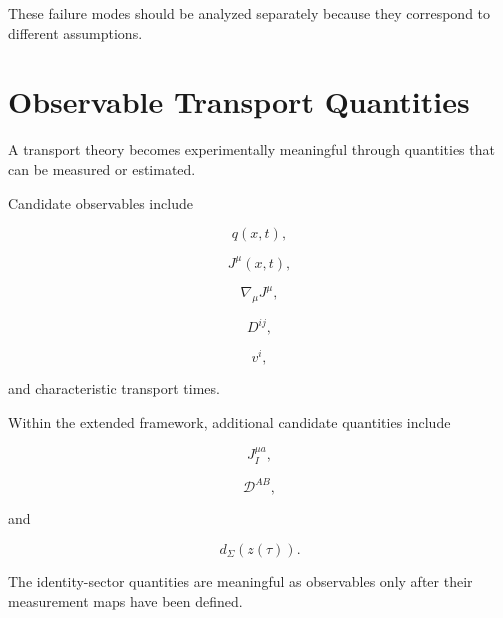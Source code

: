 \documentclass[12pt,oneside]{book}
\begin{document}
These failure modes should be analyzed separately because they
correspond to different assumptions.


\section{Observable Transport Quantities}
\label{sec:transport-observables}

A transport theory becomes experimentally meaningful through
quantities that can be measured or estimated.

Candidate observables include

\begin{equation}
    q(x,t),
\end{equation}

\begin{equation}
    J^\mu(x,t),
\end{equation}

\begin{equation}
    \nabla_\mu J^\mu,
\end{equation}

\begin{equation}
    D^{ij},
\end{equation}

\begin{equation}
    v^i,
\end{equation}

and characteristic transport times.

Within the extended framework, additional candidate quantities
include

\begin{equation}
    J_I^{\mu a},
\end{equation}

\begin{equation}
    \mathcal{D}^{AB},
\end{equation}

and

\begin{equation}
    d_{\Sigma}(z(\tau)).
\end{equation}

The identity-sector quantities are meaningful as observables
only after their measurement maps have been defined.

\end{document}
